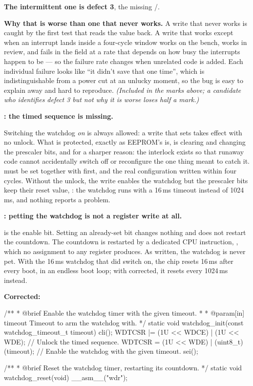 \textbf{The intermittent one is defect 3}, the missing /.

\textbf{Why that is worse than one that never works.} A write that never works is caught by the
first test that reads the value back. A write that works except when an interrupt lands inside a
four-cycle window works on the bench, works in review, and fails in the field at a rate that
depends on how busy the interrupts happen to be --- so the failure rate changes when unrelated code
is added. Each individual failure looks like ``it didn't save that one time'', which is
indistinguishable from a power cut at an unlucky moment, so the bug is easy to explain away and hard
to reproduce. \textit{(Included in the marks above; a candidate who identifies defect 3 but not why
it is worse loses half a mark.)}

\textbf{: the timed sequence is missing.} 

Switching the watchdog \emph{on} is always allowed: a write that sets  takes effect with
no unlock. What is protected, exactly as EEPROM's  is, is clearing  and
changing the prescaler bits, and for a sharper reason: the interlock exists so that runaway code
cannot accidentally switch off or reconfigure the one thing meant to catch it.  must be
set together with  first, and the real configuration written within four cycles. Without
the unlock, the write enables the watchdog but the prescaler bits keep their reset value,
: the watchdog runs with a 16\,ms timeout instead of 1024\,ms, and nothing reports a
problem.

\textbf{: petting the watchdog is not a register write at all.}

 is the enable bit. Setting an already-set bit changes nothing and does not restart the
countdown. The countdown is restarted by a dedicated CPU instruction, , which no
assignment to any register produces. As written, the watchdog is never pet. With the 16\,ms
watchdog that  did switch on, the chip resets 16\,ms after every boot, in an
endless boot loop; with  corrected, it resets every 1024\,ms instead.

\textbf{Corrected:} 

\begin{ccode}
/**
 * @brief Enable the watchdog timer with the given timeout.
 *
 * @param[in] timeout Timeout to arm the watchdog with.
 */
static void watchdog_init(const watchdog_timeout_t timeout)
{
    cli();
    WDTCSR |= (1U << WDCE) | (1U << WDE);      // Unlock the timed sequence.
    WDTCSR = (1U << WDE) | (uint8_t)(timeout); // Enable the watchdog with the given timeout.
    sei();
}

/**
 * @brief Reset the watchdog timer, restarting its countdown.
 */
static void watchdog_reset(void)
{
    __asm__("wdr");
}
\end{ccode}

